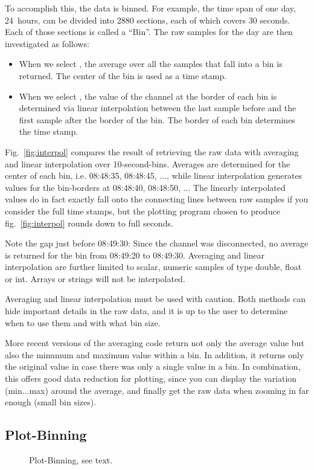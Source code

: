 \noindent To accomplish this, the data is binned. For example, the
time span of one day, 24~hours, can be divided into 2880 sections,
each of which covers 30 seconds. Each of those sections is called a
``Bin''. The raw samples for the day are then investigated as follows:
\begin{itemize}
\item When we select , the average over all the
  samples that fall into a bin is returned. The center of the bin is
  used as a time stamp.
\item When we select , the value of the
  channel at the border of each bin is determined via linear
  interpolation between the last sample before and the first sample
  after the border of the bin.
  The border of each bin determines the time stamp.
\end{itemize}

\noindent Fig.~\ref{fig:interpol} compares the result of retrieving
the raw data with averaging and linear interpolation over
10-second-bins.  Averages are determined for the center of each bin,
i.e. 08:48:35, 08:48:45, ..., while linear interpolation generates
values for the bin-borders at 08:48:40, 08:48:50, ...  The linearly
interpolated values do in fact exactly fall onto the connecting lines
between raw samples if you consider the full time stamps, but the
plotting program chosen to produce fig.~\ref{fig:interpol} rounds down
to full seconds.

Note the gap just before 08:49:30: Since the channel was disconnected,
no average is returned for the bin from 08:49:20 to 08:49:30. 
Averaging and linear interpolation are further limited to scalar, numeric
samples of type double, float or int. Arrays or strings will not be
interpolated.

\NOTE Averaging and linear interpolation must be used with caution.
Both methods can hide important details in the raw data, and it is up
to the user to determine when to use them and with what bin size.

More recent versions of the averaging code return not only the average
value but also the minumum and maximum value within a bin.
In addition, it returns only the original value in case there was only
a single value in a bin.
In combination, this offers good data reduction for plotting,
since you can display the variation (min...max) around the average,
and finally get the raw data when zooming in far enough (small bin sizes).

\subsection{Plot-Binning} \label{sec:plotbinning}
\begin{figure}[htb]
\begin{center}
\medskip
{}
\end{center}
\caption{\label{fig:plotbin}Plot-Binning, see text.}
\end{figure}


